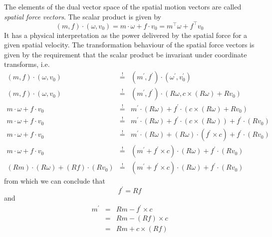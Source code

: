\documentclass[a4paper]{article}
\begin{document}
The elements of the dual vector space of the spatial motion vectors are called \textit{spatial force vectors}. The scalar product is given by
\begin{equation}
(m, f) \cdot (\omega, v_0) = m \cdot \omega + f \cdot v_0 = m^\top \omega + f^\top v_0
\end{equation}
It has a physical interpretation as the power delivered by the spatial force for a given spatial velocity. The transformation behaviour of the spatial force vectors is given by the requirement that the scalar product be invariant under coordinate transforms, i.e.
\begin{eqnarray}
(m, f) \cdot (\omega, v_0) &\stackrel{!}{=}& (m^\prime, f^\prime) \cdot (\omega^\prime, v_0^\prime)\\
(m, f) \cdot (\omega, v_0) &\stackrel{!}{=}& (m^\prime, f^\prime) \cdot (R \omega, c \times (R \omega) + R v_0)\\
m \cdot \omega + f \cdot v_0 &\stackrel{!}{=}& m^\prime \cdot (R \omega) + f^\prime \cdot (c \times (R \omega) + R v_0)\\
m \cdot \omega + f \cdot v_0 &\stackrel{!}{=}& m^\prime \cdot (R \omega) + f^\prime \cdot (c \times (R \omega)) + f^\prime \cdot (R v_0)\\
m \cdot \omega + f \cdot v_0 &\stackrel{!}{=}& m^\prime \cdot (R \omega) + (R \omega) \cdot (f^\prime \times c) + f^\prime \cdot (R v_0)\\
m \cdot \omega + f \cdot v_0 &\stackrel{!}{=}& (m^\prime + f^\prime \times c) \cdot (R \omega)  + f^\prime \cdot (R v_0)\\
(R m) \cdot (R \omega) + (R f) \cdot (R v_0) &\stackrel{!}{=}& (m^\prime + f^\prime \times c) \cdot (R \omega)  + f^\prime \cdot (R v_0)
\end{eqnarray}
from which we can conclude that
\begin{equation}
f^\prime = R f
\end{equation}
and
\begin{eqnarray}
\nonumber m^\prime &=& Rm - f^\prime \times c\\
\nonumber &=& Rm - (Rf) \times c\\
&=& Rm + c \times (Rf)
\end{eqnarray}
\end{document}
